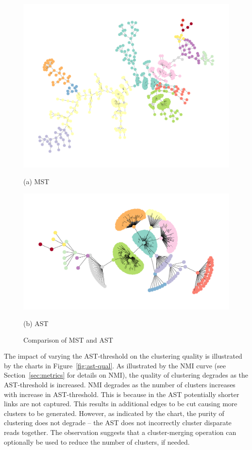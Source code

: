 \begin{figure}[h]
  \begin{minipage}{\linewidth}
    \centerline{\includegraphics[width=\linewidth]{../charts/mst_vs_ast/ha_500_digraph.pdf}}
    \centerline{\footnotesize{(a) MST}}
  \end{minipage}
  
  \begin{minipage}{\linewidth}
    \centerline{\includegraphics[width=\linewidth]{../charts/mst_vs_ast/ha_500_ast_digraph.pdf}}
    \centerline{\footnotesize{(b) AST}}
  \end{minipage}
  \caption{Comparison of MST and AST}\label{fig:mst-ast}
\end{figure}

The impact of varying the AST-threshold on the clustering quality is
illustrated by the charts in Figure~\ref{fig:ast-qual}.  As
illustrated by the NMI curve (see Section~\ref{sec:metrics} for
details on NMI), the quality of clustering degrades as the
AST-threshold is increased.  NMI degrades as the number of clusters
increases with increase in AST-threshold.  This is because in the AST
potentially shorter links are not captured.  This results in
additional edges to be cut causing more clusters to be generated.
However, as indicated by the chart, the purity of clustering does not
degrade -- \ie\/ the AST does not incorrectly cluster disparate reads
together.  The observation suggests that a cluster-merging operation
can optionally be used to reduce the number of clusters, if needed.

